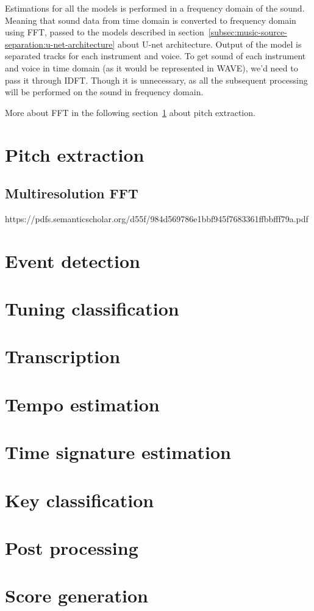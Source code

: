 Estimations for all the models is performed in a frequency domain of the sound. Meaning that sound data from time domain
is converted to frequency domain using \ac{FFT}, passed to the models described in section~\ref{subsec:music-source-separation:u-net-architecture}
about U-net architecture. Output of the model is separated tracks for each instrument and voice. To get sound of each
instrument and voice in time domain (as it would be represented in \ac{WAVE}), we'd need to pass it through \ac{IDFT}.
Though it is unnecessary, as all the subsequent processing will be performed on the sound in frequency domain.

More about \ac{FFT} in the following section~\ref{sec:pitch-extraction} about pitch extraction.

\section{Pitch extraction}\label{sec:pitch-extraction}

\subsection{Multiresolution \ac{FFT}}\label{subsec:multiresolution-fft}
https://pdfs.semanticscholar.org/d55f/984d569786e1bbf945f7683361ffbbfff79a.pdf

\section{Event detection}\label{sec:event-detection}

\section{Tuning classification}\label{sec:tunning-classification}

\section{Transcription}\label{sec:transcription}

\section{Tempo estimation}\label{sec:tempo-estimation}

\section{Time signature estimation}\label{sec:time-signature-estimation}

\section{Key classification}\label{sec:key-classification}

\section{Post processing}\label{sec:post-processing}

\section{Score generation}\label{sec:score-generation}



